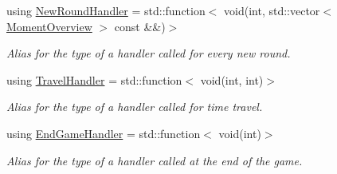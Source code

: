 \begin{DoxyCompactItemize}
using \hyperlink{class_antitelephone_game_a8133e046c3f00cf8b1b056c6e67666c9}{New\+Round\+Handler} = std\+::function$<$ void(int, std\+::vector$<$ \hyperlink{classexternal_1_1_moment_overview}{Moment\+Overview} $>$ const  \&\&)$>$
\begin{DoxyCompactList}\small\item\em Alias for the type of a handler called for every new round. \end{DoxyCompactList}\item 
using \hyperlink{class_antitelephone_game_af20c5801994054663bdb537b40c6683d}{Travel\+Handler} = std\+::function$<$ void(int, int)$>$
\begin{DoxyCompactList}\small\item\em Alias for the type of a handler called for time travel. \end{DoxyCompactList}\item 
\mbox{\label{class_antitelephone_game_a9b790d05b5201d728aa47dd6001f5786}} 
using \hyperlink{class_antitelephone_game_a9b790d05b5201d728aa47dd6001f5786}{End\+Game\+Handler} = std\+::function$<$ void(int)$>$
\begin{DoxyCompactList}\small\item\em Alias for the type of a handler called at the end of the game. \end{DoxyCompactList}\end{DoxyCompactItemize}
